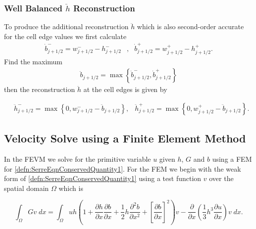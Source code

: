 \documentclass[times]{elsarticle}
\begin{document}
\subsubsection{Well Balanced $\ddot{h}$ Reconstruction}
To produce the additional reconstruction $\ddot{h}$ which is also second-order accurate for the cell edge values we first calculate
\begin{align}
\dot{b}^-_{j+1/2} = w^-_{j+1/2} - h^-_{j+1/2} &, &\dot{b}^+_{j+1/2} = w^+_{j+1/2} - h^+_{j+1/2}.
\label{eqn:BedReDefWmH}
\end{align}
Find the maximum
\begin{align*}
\ddot{b}_{j+1/2} = \max\left\lbrace\dot{b}^-_{j+1/2} , \dot{b}^+_{j+1/2} \right\rbrace
\end{align*}
then the reconstruction $\ddot{h}$ at the cell edges is given by

\begin{align}
&\ddot{h}^-_{j+1/2} = \max\left\lbrace 0, w^-_{j+1/2} - \ddot{b}_{j+1/2}  \right\rbrace, &\ddot{h}^+_{j+1/2} = \max\left\lbrace 0, w^+_{j+1/2} - \ddot{b}_{j+1/2} \right\rbrace.
\label{eqn:ModifiedHValue}
\end{align}


\subsection{Velocity Solve using a Finite Element Method}
In the FEVM we solve for the primitive variable $u$ given $h$, $G$ and $b$ using a FEM for \eqref{defn:SerreEqnConservedQuantity1}. For the FEM we begin with the weak form of \eqref{defn:SerreEqnConservedQuantity1} using a test function $v$ over the spatial domain $\Omega$ which is 

\begin{equation*}
\int_{\Omega } G v \; dx =  \int_{\Omega } uh \left(1 + \frac{\partial h}{\partial x}\frac{\partial b}{\partial x} + \frac{1}{2}h\frac{\partial^2 b}{\partial x^2} +  \left[\frac{\partial b}{\partial x}\right]^2 \right) v - \frac{\partial}{\partial x}\left(\frac{1}{3}h^3  \frac{\partial {u}}{\partial x}\right) v \; dx.
\end{equation*}
\end{document}

